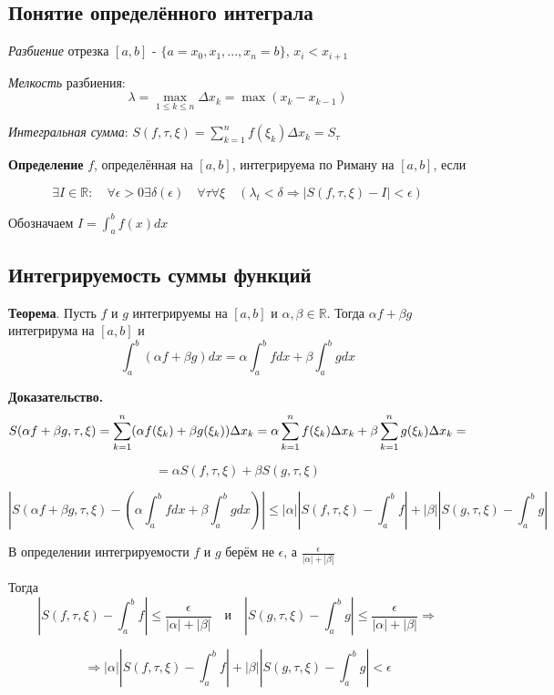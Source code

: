 \documentclass[a4paper]{article}
\begin{document}
\begin{definit}
\subsection*{Понятие определённого интеграла}

\textit{Разбиение} отрезка $[a, b]$ - $\{ a = x_0, x_1, ..., x_n = b\}$, $x_i < x_{i+1}$

\textit{Мелкость} разбиения: $$\lambda = \max_{1 \leq k \leq n} \Delta x_k = \max (x_k - x_{k-1})$$

\textit{Интегральная сумма}: $S(f, \tau, \xi) = \sum_{k=1}^n f(\xi_k) \Delta x_k = S_\tau$

\textbf{Определение} $f$, определённая на $[a,b]$, интегрируема по Риману на $[a,b]$, если

$$\exists I \in \mathbb{R}: \quad \forall \epsilon > 0 \exists \delta (\epsilon) \quad \forall \tau  \forall \xi \quad (\lambda_t < \delta \Rightarrow |S(f, \tau, \xi) - I| < \epsilon)$$

Обозначаем $I = \int_a^b f(x)dx$


\end{definit}

\begin{definit}
\subsection*{Интегрируемость суммы функций}
\begin{htheorem}\textbf{Теорема}.
Пусть $f$ и $g$ интегрируемы на $[a,b]$ и $\alpha, \beta \in \mathbb{R}$. Тогда $\alpha f + \beta g$ интегрирума на $[a,b]$ и $$\int_a^b(\alpha f + \beta g)dx = \alpha \int_a^b fdx + \beta \int_a^b gdx$$
\end{htheorem}

\begin{hproof}\textbf{Доказательство.}
$$S(\alpha f + \beta g, \tau, \xi) = \sum_{k=1}^n (\alpha f(\xi_k) + \beta g(\xi_k)) \Delta x_k = \newline \alpha \sum_{k=1}^n f(\xi_k) \Delta x_k + \beta \sum_{k=1}^n g(\xi_k) \Delta x_k = $$ 

$$= \alpha S(f, \tau, \xi) + \beta S(g, \tau, \xi)$$


$$ \left| S(\alpha f + \beta g, \tau, \xi) - \left( \alpha \int_a^b fdx + \beta \int_a^b gdx \right) \right| \leq |\alpha| \left| S(f, \tau, \xi) - \int_a^b f \right| + |\beta| \left| S(g, \tau, \xi) - \int_a^b g  \right|$$

В определении интегрируемости $f$ и $g$ берём не $\epsilon$, а $\frac{\epsilon}{|\alpha|+|\beta|}$

Тогда $$ \left| S(f, \tau, \xi) - \int_a^b f \right| \leq \frac{\epsilon}{|\alpha|+|\beta|}\quad \text{и} \quad \left| S(g, \tau, \xi) - \int_a^b g  \right| \leq \frac{\epsilon}{|\alpha|+|\beta|} \Rightarrow$$

$$
\Rightarrow |\alpha| \left| S(f, \tau, \xi) - \int_a^b f \right| + |\beta| \left| S(g, \tau, \xi) - \int_a^b g  \right| < \epsilon$$

\end{hproof}
\end{definit}
\end{document}
